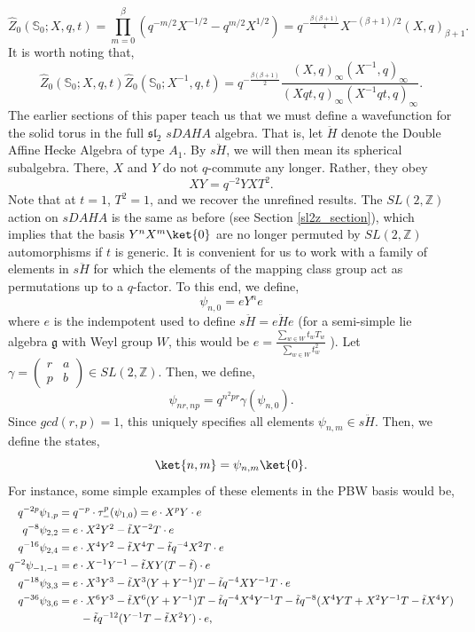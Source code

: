 \documentclass{article}
\numberwithin{corollary}{theorem}
\numberwithin{corollary}{proposition}
\begin{document}
$$\hat{Z}_0 (\mathbb{S}_0;X,q,t) = \prod_{m=0}^\beta \left( q^{-m/2} X ^{-1/2}-q^{m/2} X ^{1/2} \right) =q^{-\frac{\beta(\beta+1)}{4}}X^{-(\beta+1)/2} (X,q)_{\beta+1}.$$
It is worth noting that, 
$$\hat{Z}_0 (\mathbb{S}_0;X,q,t) \hat{Z}_0 (\mathbb{S}_0;X^{-1},q,t) = q^{-\frac{\beta(\beta+1)}{2}} \frac{(X,q)_\infty (X^{-1},q)_\infty}{(Xqt,q)_\infty (X^{-1}qt,q)_\infty}.$$
The earlier sections of this paper teach us that we must define a wavefunction for the solid torus in the full $\mathfrak{sl}_2$ $sDAHA$ algebra. That is, let $\ddot{H}$ denote the Double Affine Hecke Algebra \cite{C2} of type $A_1$. By $s\ddot{H}$, we will then mean its spherical subalgebra. There, $X$ and $Y$ do not $q$-commute any longer. Rather, they obey
$$XY = q^{-2}YX T^2.$$
Note that at $t=1$, $T^2=1$, and we recover the unrefined results. The $SL(2,\mathbb{Z})$ action on $sDAHA$ is the same as before (see Section \ref{sl2z_section}), which implies that the basis $Y^n X^m \ket{0}$ are no longer permuted by $SL(2,\mathbb{Z})$ automorphisms if $t$ is generic. It is convenient for us to work with a family of elements in $s\ddot{H}$ for which the elements of the mapping class group act as permutations up to a $q$-factor. To this end, we define,
$$\psi_{n,0} = e Y^n e$$ 
where $e$ is the indempotent used to define $s\ddot{H} = e \ddot{H}e$ (for a semi-simple lie algebra $\mathfrak{g}$ with Weyl group $W$, this would be $e = \frac{\sum_{w\in W}t_w T_w}{\sum_{w\in W}t_w^2}$ ). Let $\gamma = \begin{pmatrix}
    r&a\\p&b
\end{pmatrix} \in SL(2,\mathbb{Z})$. Then, we define,
$$\psi_{nr,np} = q^{n^2p r}\gamma(\psi_{n,0}).$$
Since $gcd(r,p)=1$, this uniquely specifies all elements $\psi_{n,m} \in s\ddot{H}$. Then, we define the states,
$$\ket{n,m} = \psi_{n,m}\ket{0}.$$
For instance, some simple examples of these elements in the PBW basis would be,
\begin{align*}
 q^{-2p}\psi_{1,p} &= q^{-p} \cdot \tau^p_-(\psi_{1,0}) = e \cdot  X^p Y\cdot e \\
 q^{-8} \psi_{2,2} &=  e\cdot X^2 Y^2 -\tilde{t} X^{-2}T \cdot e \\
 q^{-16} \psi_{2,4} &=   e\cdot X^4Y^2 -\tilde{t} X^4 T -\tilde{t} q^{-4} X^2T\cdot e\\
 q^{-2}\psi_{-1,-1} &=   e\cdot X^{-1} Y^{-1} -\tilde{t} XY (T-\tilde{t})\cdot e\\
 q^{-18}\psi_{3,3} &=   e\cdot X^3 Y^3 - \tilde{t} X^3(Y+Y^{-1})T -\tilde{t} q^{-4} XY^{-1} T\cdot e\\
 q^{-36} \psi_{3,6} &=   e\cdot X^6 Y^3 - \tilde{t} X^6(Y+Y^{-1})T -\tilde{t} q^{-4} X^4Y^{-1} T  -\tilde{t} q^{-8}(X^4YT +X^{2} Y^{-1}T -\tilde{t} X^4Y)  \\ & \hspace{0.7cm} - \tilde{t}q^{-12} (Y^{-1} T -\tilde{t} X^2Y)\cdot e,
\end{align*}
\end{document}

